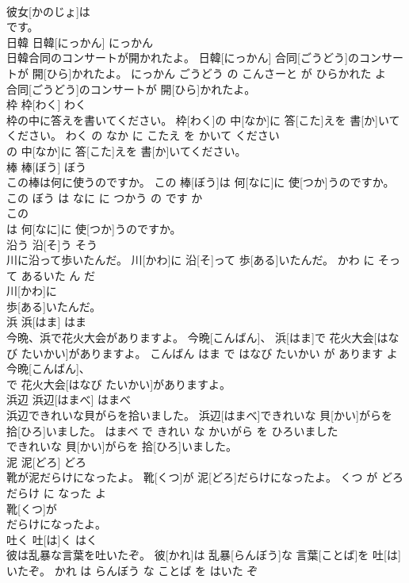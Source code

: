 \documentclass[8pt]{extreport}
\begin{document}
\begin{CJK}{UTF8}{min}
\\	彼女[かのじょ]は
\\	です。			
\\	日韓	日韓[にっかん]	にっかん	
\\	日韓合同のコンサートが開かれたよ。	日韓[にっかん] 合同[ごうどう]のコンサートが 開[ひら]かれたよ。	にっかん ごうどう の こんさーと が ひらかれた よ	
\\	合同[ごうどう]のコンサートが 開[ひら]かれたよ。			
\\	枠	枠[わく]	わく	
\\	枠の中に答えを書いてください。	枠[わく]の 中[なか]に 答[こた]えを 書[か]いてください。	わく の なか に こたえ を かいて ください	
\\	の 中[なか]に 答[こた]えを 書[か]いてください。			
\\	棒	棒[ぼう]	ぼう	
\\	この棒は何に使うのですか。	この 棒[ぼう]は 何[なに]に 使[つか]うのですか。	この ぼう は なに に つかう の です か	
\\	この
\\	は 何[なに]に 使[つか]うのですか。			
\\	沿う	沿[そ]う	そう	
\\	川に沿って歩いたんだ。	川[かわ]に 沿[そ]って 歩[ある]いたんだ。	かわ に そって あるいた ん だ	
\\	川[かわ]に
\\	歩[ある]いたんだ。			
\\	浜	浜[はま]	はま	
\\	今晩、浜で花火大会がありますよ。	今晩[こんばん]、 浜[はま]で 花火大会[はなび たいかい]がありますよ。	こんばん はま で はなび たいかい が あります よ	
\\	今晩[こんばん]、
\\	で 花火大会[はなび たいかい]がありますよ。			
\\	浜辺	浜辺[はまべ]	はまべ	
\\	浜辺できれいな貝がらを拾いました。	浜辺[はまべ]できれいな 貝[かい]がらを 拾[ひろ]いました。	はまべ で きれい な かいがら を ひろいました	
\\	できれいな 貝[かい]がらを 拾[ひろ]いました。			
\\	泥	泥[どろ]	どろ	
\\	靴が泥だらけになったよ。	靴[くつ]が 泥[どろ]だらけになったよ。	くつ が どろだらけ に なった よ	
\\	靴[くつ]が
\\	だらけになったよ。			
\\	吐く	吐[は]く	はく	
\\	彼は乱暴な言葉を吐いたぞ。	彼[かれ]は 乱暴[らんぼう]な 言葉[ことば]を 吐[は]いたぞ。	かれ は らんぼう な ことば を はいた ぞ	

\end{CJK}
\end{document}
